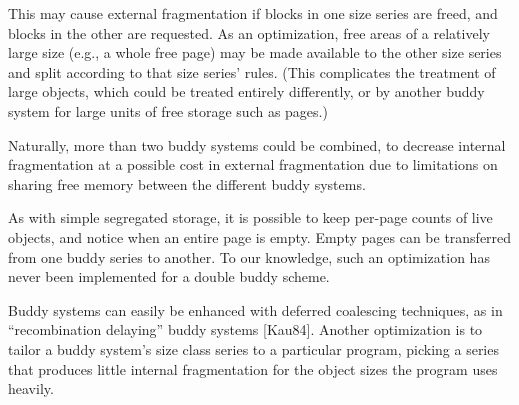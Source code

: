 \documentclass[a4paper,12pt,notitlepage,twoside,openright]{article}
\begin{document}
This may cause external fragmentation if blocks in one size series are freed,
and blocks in the other are requested. As an optimization, free areas of a relatively
large size (e.g., a whole free page) may be made available to the other size
series and split according to that size series' rules. (This complicates the treatment
of large objects, which could be treated entirely differently, or by another
buddy system for large units of free storage such as pages.)

Naturally, more than two buddy systems could be combined, to decrease
internal fragmentation at a possible cost in external fragmentation due to limitations
on sharing free memory between the different buddy systems.

As with simple segregated storage, it is possible to keep per-page counts of live
objects, and notice when an entire page is empty. Empty pages can be transferred
from one buddy series to another. To our knowledge, such an optimization has
never been implemented for a double buddy scheme.

Buddy systems can easily be enhanced with deferred coalescing techniques,
as in ``recombination delaying'' buddy systems [Kau84]. Another optimization
is to tailor a buddy system's size class series to a particular program, picking a
series that produces little internal fragmentation for the object sizes the program
uses heavily.
\end{document}

